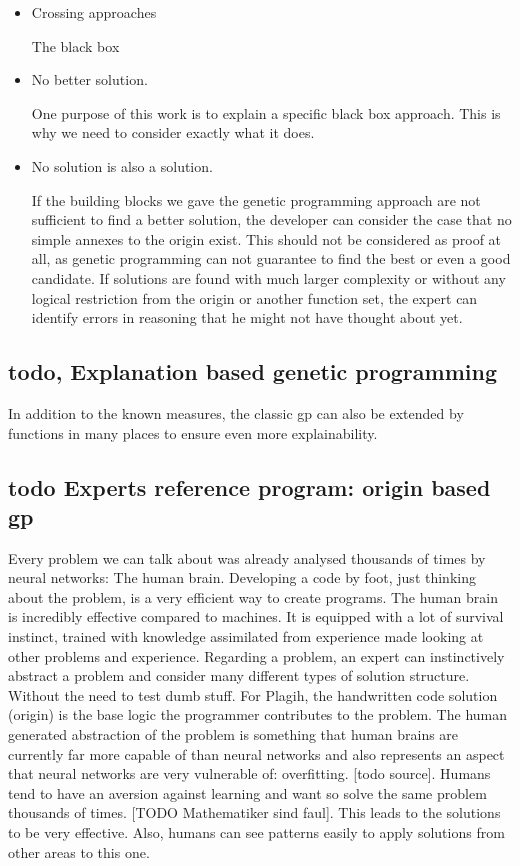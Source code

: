 \begin{itemize}
    \item Crossing approaches
    
    The black box 
    \item No better solution.
    
    One purpose of this work is to explain a specific black box approach. This is why we need to consider exactly what it does.
    \item No solution is also a solution.
    
    If the building blocks we gave the genetic programming approach are not sufficient to find a better solution, the developer can consider the case that no simple annexes to the origin exist. This should not be considered as proof at all, as genetic programming can not guarantee to find  the best or even a good candidate. If solutions are found with much larger complexity or without any logical restriction from the origin or another function set, the expert can identify errors in reasoning that he might not have thought about yet.
\end{itemize}








\subsection{todo, Explanation based genetic programming}

In addition to the known measures, the classic gp can also be extended by functions in many places to ensure even more explainability.


\subsection{todo Experts reference program: origin based gp}
Every problem we can talk about was already analysed thousands of times by neural networks: The human brain. Developing a code by foot, just thinking about the problem, is a very efficient way to create programs. The human brain is incredibly effective compared to machines. It is equipped with a lot of survival instinct, trained with knowledge assimilated from experience made looking at other problems and experience. Regarding a problem, an expert can instinctively abstract a problem and consider many different types of solution structure. Without the need to test dumb stuff. For Plagih, the handwritten code solution (origin) is the base logic the programmer contributes to the problem. The human generated abstraction of the problem is something that human brains are currently far more capable of than neural networks and also represents an aspect that neural networks are very vulnerable of: overfitting. [todo source]. Humans tend to have an aversion against learning and want so solve the same problem thousands of times. [TODO Mathematiker sind faul]. This leads to the solutions to be very effective. Also, humans can see patterns easily to apply solutions from other areas to this one.

